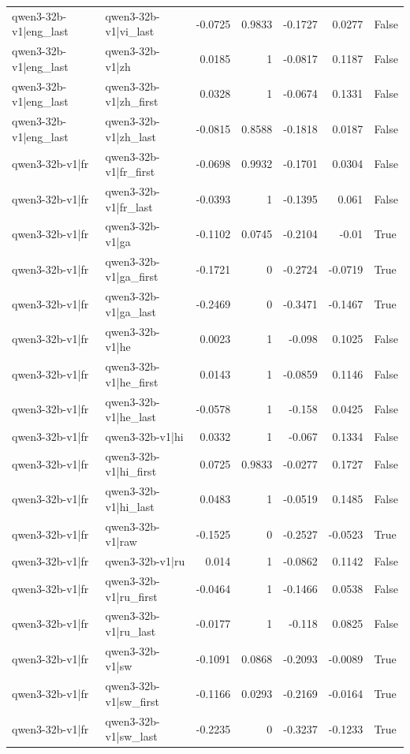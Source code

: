 \begin{table}
\begin{tabular}{l l r r r r l}
qwen3-32b-v1|eng_last & qwen3-32b-v1|vi_last & -0.0725 & 0.9833 & -0.1727 & 0.0277 & False \\
qwen3-32b-v1|eng_last & qwen3-32b-v1|zh & 0.0185 & 1 & -0.0817 & 0.1187 & False \\
qwen3-32b-v1|eng_last & qwen3-32b-v1|zh_first & 0.0328 & 1 & -0.0674 & 0.1331 & False \\
qwen3-32b-v1|eng_last & qwen3-32b-v1|zh_last & -0.0815 & 0.8588 & -0.1818 & 0.0187 & False \\
qwen3-32b-v1|fr & qwen3-32b-v1|fr_first & -0.0698 & 0.9932 & -0.1701 & 0.0304 & False \\
qwen3-32b-v1|fr & qwen3-32b-v1|fr_last & -0.0393 & 1 & -0.1395 & 0.061 & False \\
qwen3-32b-v1|fr & qwen3-32b-v1|ga & -0.1102 & 0.0745 & -0.2104 & -0.01 & True \\
qwen3-32b-v1|fr & qwen3-32b-v1|ga_first & -0.1721 & 0 & -0.2724 & -0.0719 & True \\
qwen3-32b-v1|fr & qwen3-32b-v1|ga_last & -0.2469 & 0 & -0.3471 & -0.1467 & True \\
qwen3-32b-v1|fr & qwen3-32b-v1|he & 0.0023 & 1 & -0.098 & 0.1025 & False \\
qwen3-32b-v1|fr & qwen3-32b-v1|he_first & 0.0143 & 1 & -0.0859 & 0.1146 & False \\
qwen3-32b-v1|fr & qwen3-32b-v1|he_last & -0.0578 & 1 & -0.158 & 0.0425 & False \\
qwen3-32b-v1|fr & qwen3-32b-v1|hi & 0.0332 & 1 & -0.067 & 0.1334 & False \\
qwen3-32b-v1|fr & qwen3-32b-v1|hi_first & 0.0725 & 0.9833 & -0.0277 & 0.1727 & False \\
qwen3-32b-v1|fr & qwen3-32b-v1|hi_last & 0.0483 & 1 & -0.0519 & 0.1485 & False \\
qwen3-32b-v1|fr & qwen3-32b-v1|raw & -0.1525 & 0 & -0.2527 & -0.0523 & True \\
qwen3-32b-v1|fr & qwen3-32b-v1|ru & 0.014 & 1 & -0.0862 & 0.1142 & False \\
qwen3-32b-v1|fr & qwen3-32b-v1|ru_first & -0.0464 & 1 & -0.1466 & 0.0538 & False \\
qwen3-32b-v1|fr & qwen3-32b-v1|ru_last & -0.0177 & 1 & -0.118 & 0.0825 & False \\
qwen3-32b-v1|fr & qwen3-32b-v1|sw & -0.1091 & 0.0868 & -0.2093 & -0.0089 & True \\
qwen3-32b-v1|fr & qwen3-32b-v1|sw_first & -0.1166 & 0.0293 & -0.2169 & -0.0164 & True \\
qwen3-32b-v1|fr & qwen3-32b-v1|sw_last & -0.2235 & 0 & -0.3237 & -0.1233 & True \\

\end{tabular}
\end{table}
